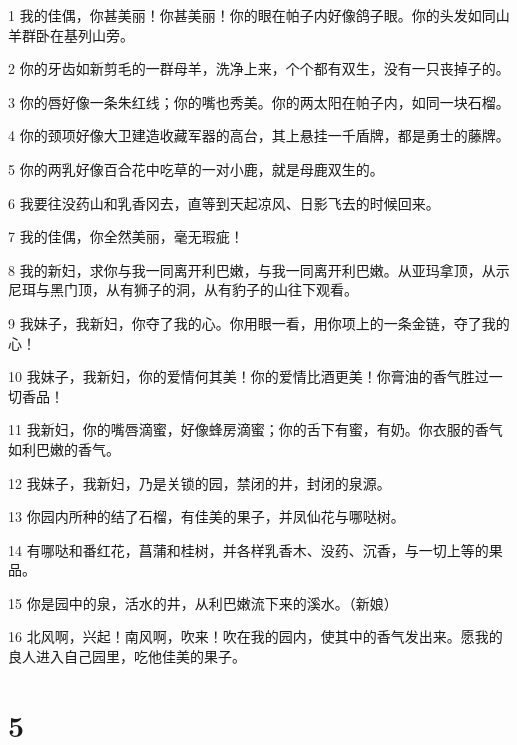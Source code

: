 \par 1 我的佳偶，你甚美丽！你甚美丽！你的眼在帕子内好像鸽子眼。你的头发如同山羊群卧在基列山旁。
\par 2 你的牙齿如新剪毛的一群母羊，洗净上来，个个都有双生，没有一只丧掉子的。
\par 3 你的唇好像一条朱红线；你的嘴也秀美。你的两太阳在帕子内，如同一块石榴。
\par 4 你的颈项好像大卫建造收藏军器的高台，其上悬挂一千盾牌，都是勇士的藤牌。
\par 5 你的两乳好像百合花中吃草的一对小鹿，就是母鹿双生的。
\par 6 我要往没药山和乳香冈去，直等到天起凉风、日影飞去的时候回来。
\par 7 我的佳偶，你全然美丽，毫无瑕疵！
\par 8 我的新妇，求你与我一同离开利巴嫩，与我一同离开利巴嫩。从亚玛拿顶，从示尼珥与黑门顶，从有狮子的洞，从有豹子的山往下观看。
\par 9 我妹子，我新妇，你夺了我的心。你用眼一看，用你项上的一条金链，夺了我的心！
\par 10 我妹子，我新妇，你的爱情何其美！你的爱情比酒更美！你膏油的香气胜过一切香品！
\par 11 我新妇，你的嘴唇滴蜜，好像蜂房滴蜜；你的舌下有蜜，有奶。你衣服的香气如利巴嫩的香气。
\par 12 我妹子，我新妇，乃是关锁的园，禁闭的井，封闭的泉源。
\par 13 你园内所种的结了石榴，有佳美的果子，并凤仙花与哪哒树。
\par 14 有哪哒和番红花，菖蒲和桂树，并各样乳香木、没药、沉香，与一切上等的果品。
\par 15 你是园中的泉，活水的井，从利巴嫩流下来的溪水。（新娘）
\par 16 北风啊，兴起！南风啊，吹来！吹在我的园内，使其中的香气发出来。愿我的良人进入自己园里，吃他佳美的果子。

\chapter{5}

